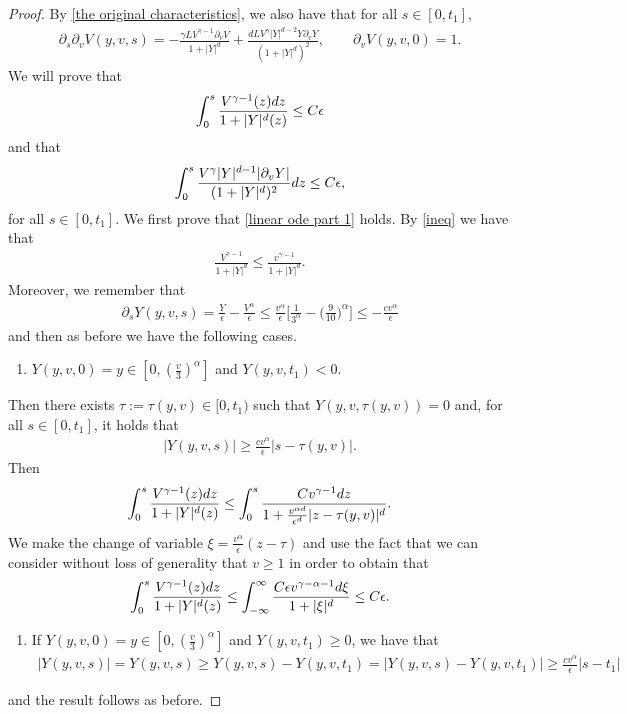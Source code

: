 \documentclass[10pt,a4paper]{amsart}
\newcommand{\der}{\textup{d}}
\begin{document}
\begin{proof}
By \eqref{the original characteristics}, we also have that for all $s\in[0,t_{1}]$,
\begin{align}\label{der v v}
    \partial_{s}\partial_{v}V(y,v,s)=-\frac{\gamma L V^{\gamma-1}\partial_{v}V}{1+|Y|^{d}}+\frac{d L V^{\gamma}|Y|^{d-2}Y\partial_{v}Y}{(1+|Y|^{d})^{2}}, \qquad \partial_{v}V(y,v,0)=1.
\end{align}
We will prove that 
\begin{align}\label{linear ode part 1}
    \int_{0}^{s}\frac{ V^{\gamma-1}(z)\der z}{1+|Y|^{d}(z)}\leq C\epsilon
\end{align}
and that 
\begin{align}\label{linear ode part 2}
    \int_{0}^{s}\frac{V^{\gamma}|Y|^{d-1}|\partial_{v}Y|}{(1+|Y|^{d})^{2}}\der z \leq C\epsilon,
\end{align}
for all $s\in[0,t_{1}]$. We first prove that \eqref{linear ode part 1} holds. By \eqref{ineq} we have that
\begin{align*}
   \frac{V^{\gamma-1}}{1+|Y|^{d}}\leq \frac{ v^{\gamma-1}}{1+|Y|^{d}}.
\end{align*}
Moreover, we remember that 
\begin{align*}
    \partial_{s}Y(y,v,s)=\frac{Y}{\epsilon}-\frac{V^{\alpha}}{\epsilon}\leq \frac{v^{\alpha}}{\epsilon}\bigg[\frac{1}{3^{\alpha}}-\Big(\frac{9}{10}\Big)^{\alpha}\bigg]\leq -\frac{c v^{\alpha}}{\epsilon}
\end{align*}
and then as before we have the following cases. \begin{enumerate}\item[i)]  $Y(y,v,0)=y\in[0,(\frac{v}{3})^{\alpha}]$ and $Y(y,v,t_{1})< 0$.
\end{enumerate}
Then there exists $\tau:=\tau(y,v)\in[0,t_{1})$ such that $Y(y,v,\tau(y,v))=0$ and, for all $s\in[0,t_{1}]$, it holds that
\begin{align}\label{linear bound for y}
 |Y(y,v,s)|\geq \frac{c v^{\alpha}}{\epsilon}|s- \tau(y,v)|.
\end{align}
Then 
\begin{align*}
        \int_{0}^{s}\frac{ V^{\gamma-1}(z)\der z}{1+|Y|^{d}(z)}\leq      \int_{0}^{s}\frac{ Cv^{\gamma-1}\der z}{1+ \frac{ v^{\alpha d}}{\epsilon^{d}}|z- \tau(y,v)|^{d}}.
\end{align*}
We make the change of variable $\xi=\frac{v^{\alpha}}{\epsilon}(z-\tau)$ and use the fact that we can consider without loss of generality that $v\geq 1$ in order to obtain that
\begin{align*}
        \int_{0}^{s}\frac{ V^{\gamma-1}(z)\der z}{1+|Y|^{d}(z)}\leq      \int_{-\infty}^{\infty}\frac{ C\epsilon v^{\gamma-\alpha-1}\der \xi}{1+ |\xi|^{d}}\leq C \epsilon.
\end{align*}
\begin{enumerate}
    \item[ii)]If $Y(y,v,0)=y\in[0,(\frac{v}{3})^{\alpha}]$ and $Y(y,v,t_{1})\geq 0$, we have that \begin{align*}
    |Y(y,v,s)|=Y(y,v,s)\geq Y(y,v,s)-Y(y,v,t_{1})=|Y(y,v,s)-Y(y,v,t_{1})|\geq \frac{c v^{\alpha}}{\epsilon}|s- t_{1}|
\end{align*}\end{enumerate}and the result follows as before. 


\end{proof}
\end{document}
